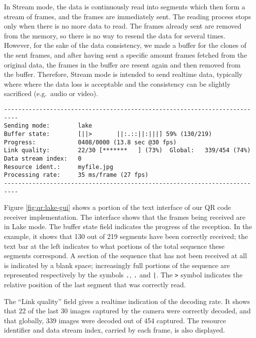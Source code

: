 In Stream mode, the data is continuously read into segments which then form a stream of frames, and the frames are immediately sent. The reading process stops only when there is no more data to read. The frames already sent are removed from the memory, so there is no way to resend the data for several times. However, for the sake of the data consistency, we made a buffer for the clones of the sent frames, and after having sent a specific amount frames fetched from the original data, the frames in the buffer are resent again and then removed from the buffer. Therefore, Stream mode is intended to send realtime data, typically where where the data loss is acceptable and the consistency can be slightly sacrificed (e.g.\ audio or video).

\begin{figure*}
\centering
\begin{verbatim}
--------------------------------------------------------------------------
Sending mode:        lake
Buffer state:        [||>       ||:.::||:|||] 59% (130/219)
Progress:            0408/0000 (13.8 sec @30 fps)
Link quality:        22/30 [*******   ] (73%)  Global:   339/454 (74%)
Data stream index:   0
Resource ident.:     myfile.jpg
Processing rate:     35 ms/frame (27 fps)
--------------------------------------------------------------------------
\end{verbatim}
\caption{Part of the text interface of the QR code receiver operating in Lake mode}
\label{fig:qr:lake-gui}
\end{figure*}

Figure \ref{fig:qr:lake-gui} shows a portion of the text interface of our QR code receiver implementation. The interface shows that the frames being received are in Lake mode. The buffer state field indicates the progress of the reception. In the example, it shows that 130 out of 219 segments have been correctly received; the text bar at the left indicates to what portions of the total sequence these segments correspond. A section of the sequence that has not been received at all is indicated by a blank space; increasingly full portions of the sequence are represented respectively by the symbols \verb+.+, \verb+.+ and \verb+|+. The \verb+>+ symbol indicates the relative position of the last segment that was correctly read.

The ``Link quality'' field gives a realtime indication of the decoding rate. It shows that 22 of the last 30 images captured by the camera were correctly decoded, and that globally, 339 images were decoded out of 454 captured. The resource identifier and data stream index, carried by each frame, is also displayed.

